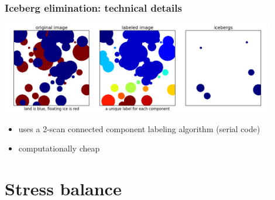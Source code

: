 \documentclass[hide notes,intlimits]{beamer}
\begin{document}
\begin{frame}
  \frametitle{Iceberg elimination: technical details}

  \begin{center}
    \includegraphics[width=0.9\textwidth]{icebergs.png}
  \end{center}

  \begin{itemize}
  \item uses a 2-scan connected component labeling algorithm (serial code)
  \item computationally cheap
  \end{itemize}
\end{frame}

\section{Stress balance}
\label{sec:stress-balance}
\end{document}
